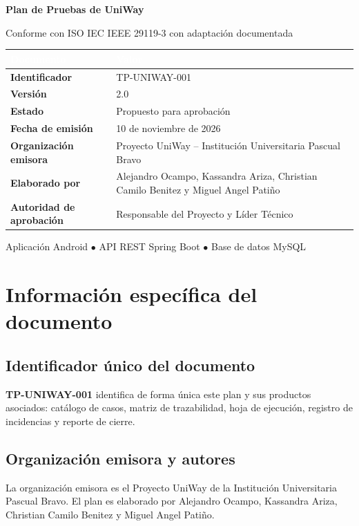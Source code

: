 \documentclass[11pt,a4paper]{article}
\newcommand{\thead}[1]{\textcolor{white}{\textbf{#1}}}
\begin{document}
\begin{titlepage}
  \centering
  \vspace*{2.5cm}
  {\Huge\bfseries Plan de Pruebas de UniWay\par}
  \vspace{0.4cm}
  {\Large Conforme con ISO IEC IEEE 29119-3 con adaptación documentada\par}
  \vspace{1.7cm}
  \begin{tabularx}{0.88\textwidth}{>{\bfseries}p{4.1cm}Y}
    \thead{Documento} & \thead{Valor}\\
    \midrule
    Identificador & TP-UNIWAY-001\\
    Versión & 2.0\\
    Estado & Propuesto para aprobación\\
    Fecha de emisión & 10 de noviembre de 2026\\
    Organización emisora & Proyecto UniWay -- Institución Universitaria Pascual Bravo\\
    Elaborado por & Alejandro Ocampo, Kassandra Ariza, Christian Camilo Benitez y Miguel Angel Patiño\\
    Autoridad de aprobación & Responsable del Proyecto y Líder Técnico\\
  \end{tabularx}
  \vfill
  {\large Aplicación Android \quad $\bullet$ \quad API REST Spring Boot \quad $\bullet$ \quad Base de datos MySQL\par}
\end{titlepage}

\tableofcontents
\newpage

\section{Información específica del documento}

\subsection{Identificador único del documento}
\textbf{TP-UNIWAY-001} identifica de forma única este plan y sus productos asociados: catálogo de casos, matriz de trazabilidad, hoja de ejecución, registro de incidencias y reporte de cierre.

\subsection{Organización emisora y autores}
La organización emisora es el Proyecto UniWay de la Institución Universitaria Pascual Bravo. El plan es elaborado por Alejandro Ocampo, Kassandra Ariza, Christian Camilo Benitez y Miguel Angel Patiño.
\end{document}
